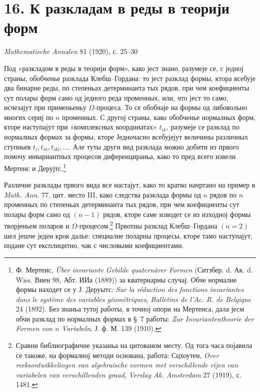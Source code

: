 ﻿\documentclass[11pt]{article}
\begin{document}

\section*{16. К разкладам в реды в теорији форм}
\begin{center}
\emph{Mathematische Annalen} 81 (1920), с. 25--30
\end{center}

Под «разкладом в реды в теорији форм», како јест знано, разумеје се, с једној страны, обобченье разклада Клебш--Гордана: то јест разклад формы, ктора всебује два бинарне реды, по степеньах детерминанта тых рядов, при чем коефициенты сут полары форм само од једного реда променных, или, что јест то само, исчезајут при применьеньу \(\Omega\)-процеса. То се обобчаје на формы од либовольно многих сериј по \(n\) променных. С другој страны, како обобченье нормалных форм, кторе наступајут при «комплексных координатах» \(t_{ik}\), разумеје се разклад по нормалных формах за формы, кторе Једночасно всебујејут величины различных ступньев \(t_i,t_{ik},t_{ikl},\ldots\). Але туты други вид разклада можно добити из првого помочу инвариантных процесов диференцираньа, како то пред всего извели Мертенс и Дерујтс.\footnote{Ф. Мертенс, \emph{Über invariante Gebilde quaternärer Formen} (Ситзбер. d. Ак. d. Wiss. Виен 98, Абт. ИИа (1889)) за кватернарны случај. Обче нормалне формы находет се у Ј. Деруытс: \emph{Sur la réduction des fonctions invariantes dans le système des variables géométriques}, \emph{Bulletins de l'Ac. R. de Belgique} 24 (1892). Без знаньа тутој работы, в точној опори на Мертенса, дала јесм обчи разклад по нормалных формах в \S~7 работы: \emph{Zur Invariantentheorie der Formen von \(n\) Variabeln}, Ј. ф. М. 139 (1910).}

Различне разклады првого вида все настајут, како то кратко начртано на пример в \emph{Math. Ann.} 77, цит. место III, како следства разклада формы од \(n\) рядов по \(n\) променных по степеньах детерминанта тых рядов, при чем коефициенты сут полары форм само од \((n-1)\) рядов, кторе саме изводет се из изходној формы творјеньем поларов и \(\Omega\)-процесом.\footnote{Сравни библиографичне указаньа на цитованом месту. Од тога часа појавила се такоже, на формалној методи основана, работа: Сцхоутен, \emph{Over reeksontwikkelingen van algebraische vormen met verschillende rijen van variabelen van verschillenden graad}, \emph{Verslag Ak. Amsterdam} 27 (1919), с. 1481.} Првотны разклад Клебш--Гордана \((n=2)\) шел јешче једен крок далье: специалне поларны процесы, кторе тамо наступајут, подане сут експлицитно, чак с числовыми коефициентами.
\end{document}
